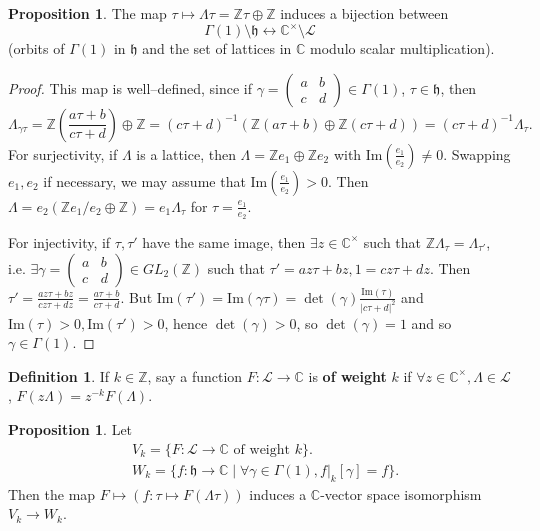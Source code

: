 \documentclass{article}
\theoremstyle{definition}
\newtheorem{prop}[theorem]{Proposition}
\newtheorem{defn}{Definition}[section]
\begin{document}
\begin{prop}
    The map $\tau \mapsto \Lambda \tau = \mathbb{Z} \tau \oplus \mathbb{Z}$ induces a bijection between $$\Gamma(1)\setminus \mathfrak{h} \leftrightarrow \mathbb{C}^\times\setminus \mathcal{L}$$ (orbits of $\Gamma(1)$ in $\mathfrak{h}$ and the set of lattices in $\mathbb{C}$ modulo scalar multiplication).
\end{prop}
\begin{proof}
    This map is well--defined, since if $\gamma = \begin{pmatrix} a & b\\ c&d \end{pmatrix} \in \Gamma(1)$, $\tau \in \mathfrak{h}$, then \[
    \Lambda_{\gamma \tau} = \mathbb{Z} \left(\frac{a \tau +b}{c \tau +d }\right) \oplus \mathbb{Z} = (c \tau + d)^{-1} \left(\mathbb{Z}(a \tau +b) \oplus \mathbb{Z}(c \tau + d)\right) = (c \tau + d)^{-1} \Lambda_{\tau}.
    \]
    For surjectivity, if $\Lambda$ is a lattice, then $\Lambda = \mathbb{Z}e_1 \oplus \mathbb{Z}e_2$ with $\text{Im}\left(\frac{e_1}{e_2}\right) \neq 0$. Swapping $e_1,e_2$ if necessary, we may assume that $\text{Im}\left(\frac{e_1}{e_2}\right)>0$. Then $\Lambda = e_2(\mathbb{Z}e_1/e_2 \oplus \mathbb{Z}) = e_1 \Lambda_\tau$ for $\tau = \frac{e_1}{e_2}$.
    \vspace{1mm}
     
    For injectivity, if $\tau,\tau'$ have the same image, then $\exists z \in \mathbb{C}^\times$ such that $\mathbb{Z}\Lambda_\tau = \Lambda_{\tau'}$, i.e. $\exists  \gamma = \begin{pmatrix} a&b\\c&d \end{pmatrix} \in GL_2(\mathbb{Z})$ such that $\tau' = az\tau + bz, 1 = cz \tau + dz$. Then $\tau' =\frac{az \tau + bz}{c z \tau + dz} = \frac{a \tau + b}{c \tau + d}$. But $\text{Im}(\tau') = \text{Im}(\gamma \tau) = \det(\gamma)\frac{\text{Im}(\tau)}{|c \tau + d|^2}$ and $\text{Im}(\tau)>0, \text{Im}(\tau')>0$, hence $\det(\gamma)>0$, so $\det(\gamma)=1$ and so $\gamma \in \Gamma(1)$. 
\end{proof}
\begin{defn}
If $k \in \mathbb{Z}$, say a function $F: \mathcal{L} \to \mathbb{C}$ is \textbf{of weight} $k$ if $\forall  z \in \mathbb{C}^\times, \Lambda \in \mathcal{L}$, $F(z \Lambda) = z^{-k}F(\Lambda)$.
\end{defn}
\begin{prop}
    Let 
    \begin{align*}
        &V_k = \{F : \mathcal{L} \to \mathbb{C} \text{ of weight }k\}.\\
        &W_k = \{f : \mathfrak{h} \to \mathbb{C} \mid \forall \gamma \in \Gamma(1), f|_k[\gamma] = f\}.
    \end{align*}
    Then the map $F \mapsto (f : \tau \mapsto F(\Lambda \tau))$ induces a $\mathbb{C}$-vector space isomorphism $V_k \to W_k$.
\end{prop}
\end{document}
